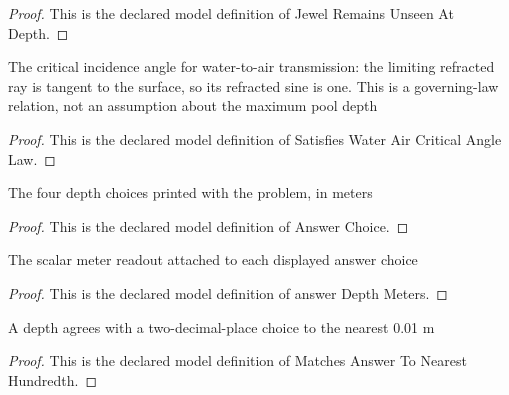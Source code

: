 \begin{proof}
  This is the declared model definition of Jewel Remains Unseen At Depth.
\end{proof}
\begin{definition}
  \label{def:physics:phyx-mini-0015:phyxminiproblems-problemphyxmini0015-satisfieswateraircriticalanglelaw}
  The critical incidence angle for water-to-air transmission: the limiting refracted ray is tangent to the surface, so its refracted sine is one. This is a governing-law relation, not an assumption about the maximum pool depth
\end{definition}
\begin{proof}
  This is the declared model definition of Satisfies Water Air Critical Angle Law.
\end{proof}
\begin{definition}
  \label{def:physics:phyx-mini-0015:phyxminiproblems-problemphyxmini0015-answerchoice}
  The four depth choices printed with the problem, in meters
\end{definition}
\begin{proof}
  This is the declared model definition of Answer Choice.
\end{proof}
\begin{definition}
  \label{def:physics:phyx-mini-0015:phyxminiproblems-problemphyxmini0015-answerdepthmeters}
  The scalar meter readout attached to each displayed answer choice
\end{definition}
\begin{proof}
  This is the declared model definition of answer Depth Meters.
\end{proof}
\begin{definition}
  \label{def:physics:phyx-mini-0015:phyxminiproblems-problemphyxmini0015-matchesanswertonearesthundredth}
  A depth agrees with a two-decimal-place choice to the nearest 0.01 m
\end{definition}
\begin{proof}
  This is the declared model definition of Matches Answer To Nearest Hundredth.
\end{proof}
